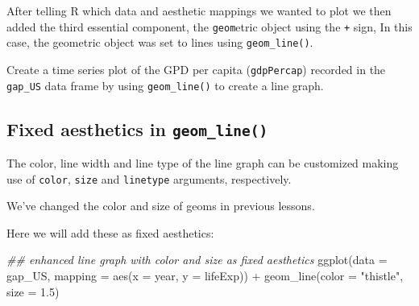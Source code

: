 \documentclass[
  letterpaper,
  DIV=11,
  numbers=noendperiod]{scrreprt}
\newenvironment{Shaded}{\begin{snugshade}}{\end{snugshade}}
\newcommand{\AttributeTok}[1]{\textcolor[rgb]{0.40,0.45,0.13}{#1}}
\newcommand{\DocumentationTok}[1]{\textcolor[rgb]{0.37,0.37,0.37}{\textit{#1}}}
\newcommand{\FloatTok}[1]{\textcolor[rgb]{0.68,0.00,0.00}{#1}}
\newcommand{\FunctionTok}[1]{\textcolor[rgb]{0.28,0.35,0.67}{#1}}
\newcommand{\NormalTok}[1]{\textcolor[rgb]{0.00,0.23,0.31}{#1}}
\newcommand{\SpecialCharTok}[1]{\textcolor[rgb]{0.37,0.37,0.37}{#1}}
\newcommand{\StringTok}[1]{\textcolor[rgb]{0.13,0.47,0.30}{#1}}
\begin{document}
After telling R which data and aesthetic mappings we wanted to plot we
then added the third essential component, the \texttt{geom}etric object
using the \texttt{+} sign, In this case, the geometric object was set to
lines using \texttt{geom\_line()}.

\begin{tcolorbox}[enhanced jigsaw, titlerule=0mm, colback=white, left=2mm, breakable, opacitybacktitle=0.6, colbacktitle=quarto-callout-tip-color!10!white, colframe=quarto-callout-tip-color-frame, bottomtitle=1mm, opacityback=0, coltitle=black, arc=.35mm, toptitle=1mm, title=\textcolor{quarto-callout-tip-color}{\faLightbulb}\hspace{0.5em}{Practice}, leftrule=.75mm, toprule=.15mm, bottomrule=.15mm, rightrule=.15mm]

Create a time series plot of the GPD per capita (\texttt{gdpPercap})
recorded in the \texttt{gap\_US} data frame by using
\texttt{geom\_line()} to create a line graph.

\end{tcolorbox}

\subsection{\texorpdfstring{Fixed aesthetics in
\texttt{geom\_line()}}{Fixed aesthetics in geom\_line()}}\label{fixed-aesthetics-in-geom_line}

The color, line width and line type of the line graph can be customized
making use of \texttt{color}, \texttt{size} and \texttt{linetype}
arguments, respectively.

We've changed the color and size of geoms in previous lessons.

Here we will add these as fixed aesthetics:

\begin{Shaded}
\begin{Highlighting}[]
\DocumentationTok{\#\# enhanced line graph with color and size as fixed aesthetics}
\FunctionTok{ggplot}\NormalTok{(}\AttributeTok{data =}\NormalTok{ gap\_US, }
       \AttributeTok{mapping =} \FunctionTok{aes}\NormalTok{(}\AttributeTok{x =}\NormalTok{ year, }
                     \AttributeTok{y =}\NormalTok{ lifeExp)) }\SpecialCharTok{+}
  \FunctionTok{geom\_line}\NormalTok{(}\AttributeTok{color =} \StringTok{"thistle"}\NormalTok{,}
            \AttributeTok{size =} \FloatTok{1.5}\NormalTok{) }
\end{Highlighting}
\end{Shaded}
\end{document}
